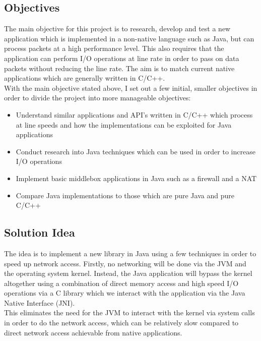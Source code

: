 \documentclass[interim_report.tex]{subfiles}
\begin{document}
\subsection{Objectives}
The main objective for this project is to research, develop and test a new application which is implemented in a non-native language such as Java, but can process packets at a high performance level. This also requires that the application can perform I/O operations at line rate in order to pass on data packets without reducing the line rate. The aim is to match current native applications which are generally written in C/C++. \\
\newline
With the main objective stated above, I set out a few initial, smaller objectives in order to divide the project into more manageable objectives:
\begin{itemize}
	\item Understand similar applications and API's written in C/C++ which process at line speeds and how the implementations can be exploited for Java applications
	\item Conduct research into Java techniques which can be used in order to increase I/O operations
	\item Implement basic middlebox applications in Java such as a firewall and a NAT
	\item Compare Java implementations to those which are pure Java and pure C/C++
\end{itemize}

\subsection{Solution Idea}
The idea is to implement a new library in Java using a few techniques in order to speed up network access. Firstly, no networking will be done via the JVM and the operating system kernel. Instead, the Java application will bypass the kernel altogether using a combination of direct memory access and high speed I/O operations via a C library which we interact with the application via the Java Native Interface (JNI). \\
\newline
This eliminates the need for the JVM to interact with the kernel via system calls in order to do the network access, which can be relatively slow compared to direct network access achievable from native applications.
\end{document}
